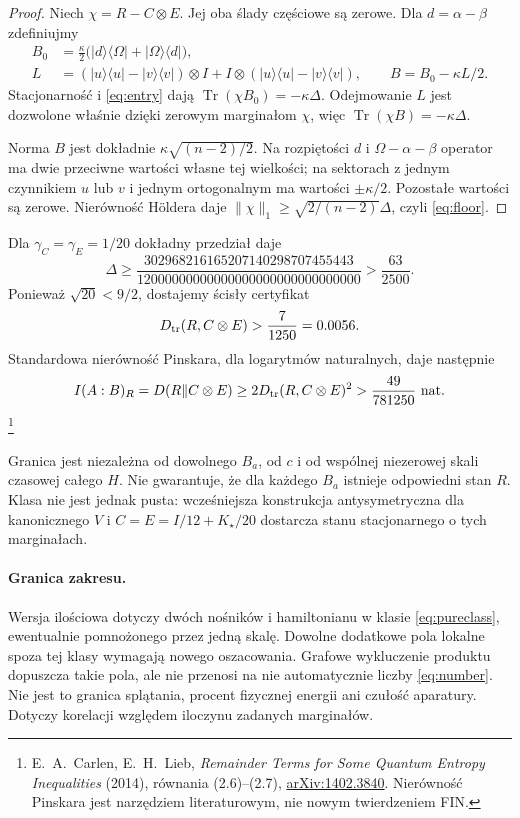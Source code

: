 \documentclass[11pt,a4paper]{article}
\newcommand{\Tr}{\operatorname{Tr}}
\newcommand{\Dtr}{D_{\rm tr}}
\begin{document}
\begin{proof}
Niech $\chi=R-C\otimes E$. Jej oba ślady częściowe są zerowe.
Dla $d=\alpha-\beta$ zdefiniujmy
\begin{align}
 B_0&=\frac\kappa2\bigl(|d\rangle\langle\Omega|
                         +|\Omega\rangle\langle d|\bigr),\\
 L&=(|u\rangle\langle u|-|v\rangle\langle v|)\otimes I
       +I\otimes(|u\rangle\langle u|-|v\rangle\langle v|),\qquad
 B=B_0-\kappa L/2.
\end{align}
Stacjonarność i \eqref{eq:entry} dają
$\Tr(\chi B_0)=-\kappa\Delta$.
Odejmowanie $L$ jest dozwolone właśnie dzięki zerowym marginałom
$\chi$, więc $\Tr(\chi B)=-\kappa\Delta$.

Norma $B$ jest dokładnie $\kappa\sqrt{(n-2)/2}$.
Na rozpiętości $d$ i $\Omega-\alpha-\beta$ operator ma dwie przeciwne
wartości własne tej wielkości; na sektorach z jednym czynnikiem $u$
lub $v$ i jednym ortogonalnym ma wartości $\pm\kappa/2$.
Pozostałe wartości są zerowe. Nierówność Höldera daje
$\|\chi\|_1\ge\sqrt{2/(n-2)}\Delta$, czyli \eqref{eq:floor}.
\end{proof}

Dla $\gamma_C=\gamma_E=1/20$ dokładny przedział daje
\[
 \Delta\ge
 \frac{302968216165207140298707455443}
      {12000000000000000000000000000000}
 >\frac{63}{2500}.
\]
Ponieważ $\sqrt{20}<9/2$, dostajemy ścisły certyfikat
\begin{equation}\label{eq:number}
 \Dtr(R,C\otimes E)>\frac7{1250}=0.0056.
\end{equation}
Standardowa nierówność Pinskara, dla logarytmów naturalnych,
daje następnie
\[
 I(A:B)_R=D(R\|C\otimes E)
 \ge2\Dtr(R,C\otimes E)^2>\frac{49}{781250}\ \text{nat}.
\]
\footnote{E.~A.~Carlen, E.~H.~Lieb,
\emph{Remainder Terms for Some Quantum Entropy Inequalities} (2014),
równania (2.6)--(2.7),
\href{https://arxiv.org/abs/1402.3840}{arXiv:1402.3840}.
Nierówność Pinskara jest narzędziem literaturowym, nie nowym twierdzeniem FIN.}

Granica jest niezależna od dowolnego $B_a$, od $c$ i od wspólnej
niezerowej skali czasowej całego $H$. Nie gwarantuje, że dla każdego
$B_a$ istnieje odpowiedni stan $R$. Klasa nie jest jednak pusta:
wcześniejsza konstrukcja antysymetryczna dla kanonicznego $V$ i
$C=E=I/12+K_\star/20$ dostarcza stanu stacjonarnego o tych marginałach.

\paragraph{Granica zakresu.}
Wersja ilościowa dotyczy dwóch nośników i hamiltonianu w klasie
\eqref{eq:pureclass}, ewentualnie pomnożonego przez jedną skalę.
Dowolne dodatkowe pola lokalne spoza tej klasy wymagają nowego
oszacowania. Grafowe wykluczenie produktu dopuszcza takie pola,
ale nie przenosi na nie automatycznie liczby \eqref{eq:number}.
Nie jest to granica splątania, procent fizycznej energii ani czułość
aparatury. Dotyczy korelacji względem iloczynu zadanych marginałów.
\end{document}
